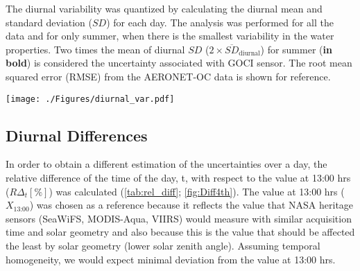 \documentclass[remotesensing,article,submit,moreauthors,pdftex,10pt,a4paper]{Definitions/mdpi}
\begin{document}
  \begin{table}[htbp!]
  \caption{The diurnal variability was quantized by calculating the diurnal mean and standard deviation ($SD$) for each day. The analysis was performed for all the data and for only summer, when there is the smallest variability in the water properties. Two times the mean of diurnal $SD$ ($2\times \overline{SD}_\text{diurnal}$) for summer (\textbf{in bold}) is considered the uncertainty associated with GOCI sensor. The root mean squared error (RMSE) from the AERONET-OC data is shown for reference. \label{tab:diurnal_var} } 
  \centering
  \texttt{[image: ./Figures/diurnal\_var.pdf]}
  \end{table}

\subsection{Diurnal Differences}
In order to obtain a different estimation of the uncertainties over a day, the relative difference of the time of the day, t, with respect to the value at 13:00 hrs ($R\Delta_t[\%]$) was calculated (\autoref{tab:rel_diff}; \autoref{fig:Diff4th}). The value at 13:00 hrs ($X_\text{13:00}$) was chosen as a reference because it reflects the value that NASA heritage sensors (SeaWiFS, MODIS-Aqua, VIIRS) would measure with similar acquisition time and solar geometry and also because this is the value that should be affected the least by solar geometry (lower solar zenith angle). Assuming temporal homogeneity, we would expect minimal deviation from the value at 13:00 hrs. 
\end{document}
